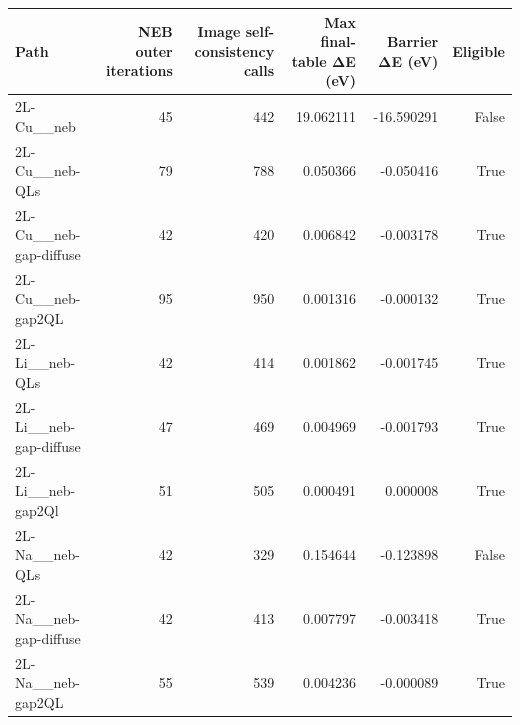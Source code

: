 \begin{tabular}{lrrrrr}
\toprule
Path & NEB outer iterations & Image self-consistency calls & Max final-table ΔE (eV) & Barrier ΔE (eV) & Eligible \\
\midrule
2L-Cu__neb & 45 & 442 & 19.062111 & -16.590291 & False \\
2L-Cu__neb-QLs & 79 & 788 & 0.050366 & -0.050416 & True \\
2L-Cu__neb-gap-diffuse & 42 & 420 & 0.006842 & -0.003178 & True \\
2L-Cu__neb-gap2QL & 95 & 950 & 0.001316 & -0.000132 & True \\
2L-Li__neb-QLs & 42 & 414 & 0.001862 & -0.001745 & True \\
2L-Li__neb-gap-diffuse & 47 & 469 & 0.004969 & -0.001793 & True \\
2L-Li__neb-gap2Ql & 51 & 505 & 0.000491 & 0.000008 & True \\
2L-Na__neb-QLs & 42 & 329 & 0.154644 & -0.123898 & False \\
2L-Na__neb-gap-diffuse & 42 & 413 & 0.007797 & -0.003418 & True \\
2L-Na__neb-gap2QL & 55 & 539 & 0.004236 & -0.000089 & True \\
\bottomrule
\end{tabular}
